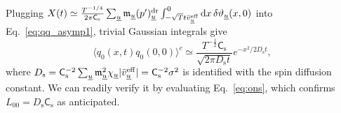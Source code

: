 \documentclass[
twocolumn,
amsfonts,
showpacs,
superscriptaddress,
amsmath,
amssymb,
aps,
longbibliography,
prl,
noeprint
]{revtex4-2}
\newcounter{ls}
\newcommand{\dd}{{\rm d}}
\newcommand{\1}{{\bf 1}}
\newcommand{\eff}{{\rm eff}}
\begin{document}
Plugging $X(t)\simeq \frac{T^{-1/4}}{2\pi\mathsf{C}_\mathrm{s}}\sum_{\underline{u}}\mathfrak{m}_{\underline{u}}(p')^\mathrm{dr}_{\underline{u}}\int_{-\sqrt{T}t\bar{v}^\eff_{\underline{u}}}^0\dd x\,\delta\vartheta_{\underline{u}}(x,0)$ into Eq.~\eqref{eq:qq_asymp1}, trivial Gaussian integrals give
\begin{equation}
     \langle q_0(x,t) q_0(0,0)\rangle^c\simeq \frac{T^{-\frac{1}{2}}\mathsf{C}_\mathrm{s}}{\sqrt{2\pi D_\mathrm{s}t}}e^{-x^2/2D_\mathrm{s}t},
\end{equation}
where $D_\mathrm{s}=\mathsf{C}^{-2}_\mathrm{s}\sum_{\underline{u}}\mathfrak{m}^2_{\underline{u}}\chi_{\underline{u}}|\bar{v}^\eff_{\underline{u}}|=\mathsf{C}^{-2}_\mathrm{s}\sigma^2$ is identified with the spin diffusion constant. We can readily verify it by evaluating Eq.~\eqref{eq:ons}, which confirms $L_{00}=D_\mathrm{s}\mathsf{C}_\mathrm{s}$ as anticipated.
\end{document}
